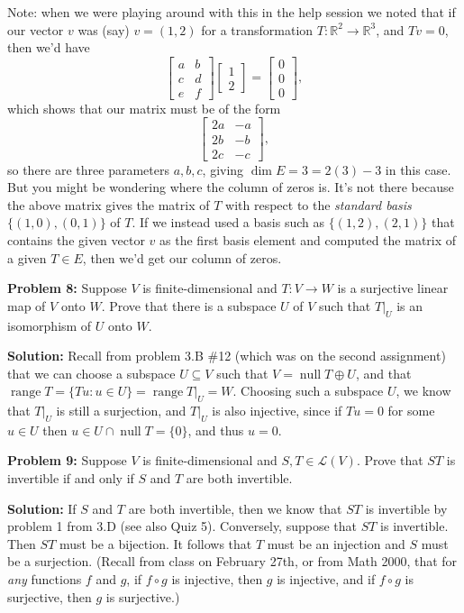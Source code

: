 \documentclass[12pt,letterpaper]{article}
\renewcommand{\L}{\mathcal{L}}
\newcommand{\R}{\mathbb{R}}
\DeclareMathOperator{\nul}{null}
\DeclareMathOperator{\range}{range}
\begin{document}
Note: when we were playing around with this in the help session we noted that if our vector $v$ was (say) $v=(1,2)$ for a transformation $T:\R^2\to\R^3$, and $Tv=0$, then we'd have
\[
\begin{bmatrix}
a&b\\c&d\\e&f
\end{bmatrix}\begin{bmatrix}1\\2\end{bmatrix} = \begin{bmatrix}
0\\0\\0
\end{bmatrix},
\]
which shows that our matrix must be of the form
\[
\begin{bmatrix}
2a&-a\\
2b&-b\\
2c&-c
\end{bmatrix},
\]
so there are three parameters $a,b,c$, giving $\dim E = 3 = 2(3)-3$ in this case. But you might be wondering where the column of zeros is. It's not there because the above matrix gives the matrix of $T$ with respect to the {\em standard basis} $\{(1,0),(0,1)\}$ of $T$. If we instead used a basis such as $\{(1,2),(2,1)\}$ that contains the given vector $v$ as the first basis element and computed the matrix of a given $T\in E$, then we'd get our column of zeros.

\bigskip

{\bf Problem 8:} Suppose $V$ is finite-dimensional and $T:V\to W$ is a surjective linear map of $V$ onto $W$. Prove that there is a subspace $U$ of $V$ such that $T|_U$ is an isomorphism of $U$ onto $W$.

\bigskip

{\bf Solution:} Recall from problem 3.B \#12 (which was on the second assignment) that we can choose a subspace $U\subseteq V$ such that $V=\nul T\oplus U$, and that $\range T = \{Tu : u\in U\} = \range T|_U=W$. Choosing such a subspace $U$, we know that $T|_U$ is still a surjection, and $T|_U$ is also injective, since if $Tu=0$ for some $u\in U$ then $u\in U\cap \nul T=\{0\}$, and thus $u=0$.

\bigskip

{\bf Problem 9:} Suppose $V$ is finite-dimensional and $S,T\in\L(V)$. Prove that $ST$ is invertible if and only if $S$ and $T$ are both invertible.

\bigskip

{\bf Solution:} If $S$ and $T$ are both invertible, then we know that $ST$ is invertible by problem 1 from 3.D (see also Quiz 5). Conversely, suppose that $ST$ is invertible. Then $ST$ must be a bijection. It follows that $T$ must be an injection and $S$ must be a surjection. (Recall from class on February 27th, or from Math 2000, that for {\em any} functions $f$ and $g$, if $f\circ g$ is injective, then $g$ is injective, and if $f\circ g$ is surjective, then $g$ is surjective.)
\end{document}
